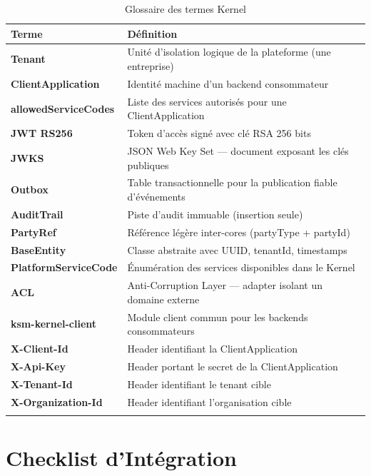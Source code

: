 \documentclass[12pt,a4paper]{report}
\begin{document}
\begin{longtable}{p{4cm}p{9cm}}
\toprule
\textbf{Terme} & \textbf{Définition} \\
\midrule
\endhead
\textbf{Tenant} & Unité d'isolation logique de la plateforme (une entreprise) \\
\textbf{ClientApplication} & Identité machine d'un backend consommateur \\
\textbf{allowedServiceCodes} & Liste des services autorisés pour une ClientApplication \\
\textbf{JWT RS256} & Token d'accès signé avec clé RSA 256 bits \\
\textbf{JWKS} & JSON Web Key Set — document exposant les clés publiques \\
\textbf{Outbox} & Table transactionnelle pour la publication fiable d'événements \\
\textbf{AuditTrail} & Piste d'audit immuable (insertion seule) \\
\textbf{PartyRef} & Référence légère inter-cores (partyType + partyId) \\
\textbf{BaseEntity} & Classe abstraite avec UUID, tenantId, timestamps \\
\textbf{PlatformServiceCode} & Énumération des services disponibles dans le Kernel \\
\textbf{ACL} & Anti-Corruption Layer — adapter isolant un domaine externe \\
\textbf{ksm-kernel-client} & Module client commun pour les backends consommateurs \\
\textbf{X-Client-Id} & Header identifiant la ClientApplication \\
\textbf{X-Api-Key} & Header portant le secret de la ClientApplication \\
\textbf{X-Tenant-Id} & Header identifiant le tenant cible \\
\textbf{X-Organization-Id} & Header identifiant l'organisation cible \\
\bottomrule
\caption{Glossaire des termes Kernel}
\end{longtable}

\chapter{Checklist d'Intégration}
\end{document}
